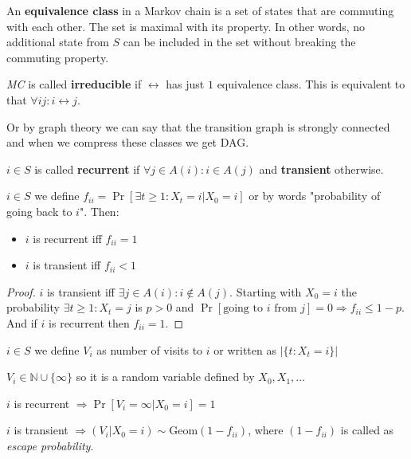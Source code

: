\begin{defn}
	An \textbf{equivalence class} in a Markov chain is a set of states that are commuting with each other. The set is maximal with its property. In other words, no additional state from $S$ can be included in the set without breaking the commuting property.
\end{defn}

\begin{defn}
	\textit{MC} is called \textbf{irreducible} if $\leftrightarrow$ has just $1$ equivalence class. This is equivalent to that $\forall ij : i \leftrightarrow j$.
	
	Or by graph theory we can say that the transition graph is strongly connected and when we compress these classes we get DAG.
\end{defn}

\begin{defn}
	$i \in S$ is called \textbf{recurrent} if $\forall j \in A(i) : i \in A(j)$ and \textbf{transient} otherwise.
\end{defn}

\begin{thm}
	$i \in S$ we define $f_{ii} = \Pr[\exists t \geq 1 : X_{t} =i \vert X_{0} = i]$ or by words "probability of going back to $i$". Then:
	
	\begin{itemize}
		\item $i$ is recurrent iff $f_{ii} = 1$
		\item $i$ is transient iff $f_{ii} < 1$
	\end{itemize}
\end{thm}

\begin{proof}
	$i$ is transient iff $\exists j \in A(i) : i \notin A(j)$. Starting with $X_{0} = i$ the probability $\exists t \geq 1 : X_{t} = j$ is $p > 0$ and $\Pr[\text{going to } i \text{ from } j] = 0 \Rightarrow f_{ii} \leq 1 - p$. And if $i$ is recurrent then $f_{ii} = 1$.
\end{proof}

\begin{defn}
	$i \in S$ we define $V_{i}$ as number of visits to $i$ or written as $|\{t : X_{t} = i\}|$
	
	$V_{i} \in \mathbb{N} \cup \{\infty\}$ so it is a random variable defined by $X_{0}, X_{1}, \dots$
\end{defn}

\begin{thm}
	$i$ is recurrent $\Rightarrow \Pr[V_{i} = \infty | X_{0} = i] = 1$
	
	$i$ is transient $\Rightarrow (V_{i} \vert X_{0}= i) \sim \text{Geom}(1 - f_{ii})$, where $(1-f_{ii})$ is called as \textit{escape probability}.
\end{thm}

